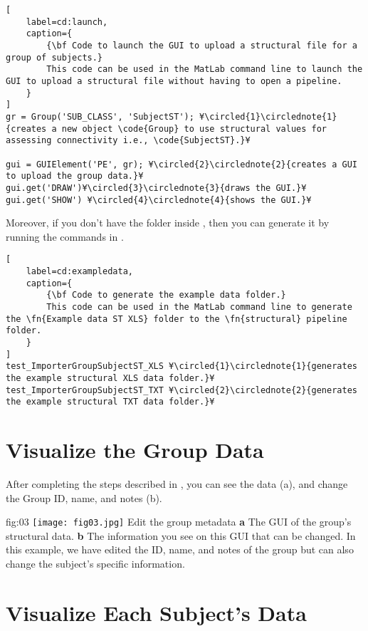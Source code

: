 \documentclass[justified]{tufte-handout}
\begin{document}
%
\begin{lstlisting}[
	label=cd:launch,
	caption={
		{\bf Code to launch the GUI to upload a structural file for a group of subjects.}
		This code can be used in the MatLab command line to launch the GUI to upload a structural file without having to open a pipeline.
	}
]
gr = Group('SUB_CLASS', 'SubjectST'); ¥\circled{1}\circlednote{1}{creates a new object \code{Group} to use structural values for assessing connectivity i.e., \code{SubjectST}.}¥

gui = GUIElement('PE', gr); ¥\circled{2}\circlednote{2}{creates a GUI to upload the group data.}¥
gui.get('DRAW')¥\circled{3}\circlednote{3}{draws the GUI.}¥
gui.get('SHOW') ¥\circled{4}\circlednote{4}{shows the GUI.}¥
\end{lstlisting}

Moreover, if you don't have the  folder inside , then you can generate it by running the commands in .

\begin{lstlisting}[
	label=cd:exampledata,
	caption={
		{\bf Code to generate the example data folder.}
		This code can be used in the MatLab command line to generate the \fn{Example data ST XLS} folder to the \fn{structural} pipeline folder.
	}
]
test_ImporterGroupSubjectST_XLS ¥\circled{1}\circlednote{1}{generates the example structural XLS data folder.}¥
test_ImporterGroupSubjectST_TXT ¥\circled{2}\circlednote{2}{generates the example structural TXT data folder.}¥
\end{lstlisting}

\section{Visualize the Group Data}

After completing the steps described in , you can see the data (a), and change the Group ID, name, and notes (b). 

	{fig:03}
	{
	\texttt{[image: fig03.jpg]}
	}
	{Edit the group metadata}
	{ 
	{\bf a} The GUI of the group's structural data. 
	{\bf b} The information you see on this GUI that can be changed. In this example, we have edited the ID, name, and notes of the group but can also change the subject's specific information.
	}

\section{Visualize Each Subject's Data}
\end{document}
